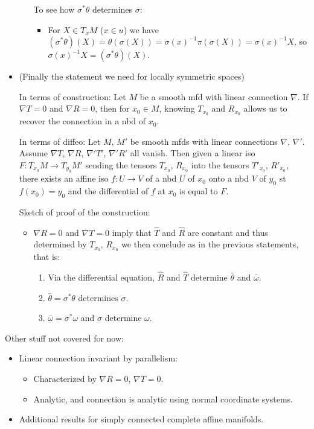 \documentclass{report}
\theoremstyle{definition}
\begin{document}
\begin{itemize}
\begin{itemize}
        To see how $\sigma^*\theta$ determines $\sigma$:
        \begin{itemize}
            \item For $X\in T_xM$ ($x\in u$) we have $(\sigma^*\theta)(X)=\theta(\sigma(X))=\sigma(x)^{-1}\pi(\sigma(X))=\sigma(x)^{-1}X$, so $\sigma(x)^{-1}X=(\sigma^*\theta)(X)$.
        \end{itemize}
    \end{itemize}

    \item (Finally the statement we need for locally symmetric spaces)

    In terms of construction: Let $M$ be a smooth mfd with linear connection $\nabla$. If $\nabla T=0$ and $\nabla R=0$, then for $x_0\in M$, knowing $T_{x_0}$ and $R_{x_0}$ allows us to recover the connection in a nbd of $x_0$.

    In terms of diffeo: Let $M$, $M'$ be smooth mfds with linear connections $\nabla$, $\nabla'$. Assume $\nabla T$, $\nabla R$, $\nabla' T'$, $\nabla' R'$ all vanish. Then given a linear iso $F:T_{x_0}M\to T_{y_0}M'$ sending the tensors $T_{x_0}$, $R_{x_0}$ into the tensors $T'_{x_0}$, $R'_{x_0}$, there exists an affine iso $f:U\to V$ of a nbd $U$ of $x_0$ onto a nbd $V$ of $y_0$ st $f(x_0)=y_0$ and the differential of $f$ at $x_0$ is equal to $F$.

    Sketch of proof of the construction:
    \begin{itemize}
        \item $\nabla R=0$ and $\nabla T=0$ imply that $\hat{T}$ and $\hat{R}$ are constant and thus determined by $T_{x_0}$, $R_{x_0}$ we then conclude as in the previous statements, that is:
        \begin{enumerate}
            \item Via the differential equation, $\hat{R}$ and $\hat{T}$ determine $\bar{\theta}$ and $\bar{\omega}$.
            \item $\bar{\theta}=\sigma^*\theta$ determines $\sigma$.
            \item $\bar{\omega}=\sigma^*\omega$ and $\sigma$ determine $\omega$.
        \end{enumerate}
    \end{itemize}
\end{itemize}

Other stuff not covered for now:
\begin{itemize}
    \item Linear connection invariant by parallelism:
    \begin{itemize}
        \item Characterized by $\nabla R=0$, $\nabla T=0$.
        \item Analytic, and connection is analytic using normal coordinate systems.
    \end{itemize}
    \item Additional results for simply connected complete affine manifolds.
\end{itemize}
\end{document}
